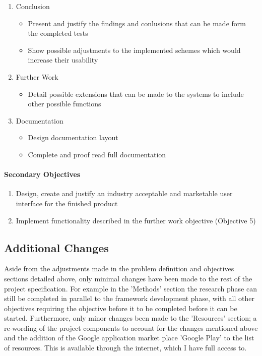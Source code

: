 \documentclass[a4paper,11pt]{article}
\begin{document}
\begin{enumerate}
\begin{itemize}
  \end{itemize}
  \item Conclusion
  \begin{itemize}
    \item Present and justify the findings and conlusions that can be made form the completed tests
    \item Show possible adjustments to the implemented schemes which would increase their usability
  \end{itemize}
  \item Further Work
  \begin{itemize}
    \item Detail possible extensions that can be made to the systems to include other possible functions
  \end{itemize}
  \item Documentation
  \begin{itemize}
    \item Design documentation layout
    \item Complete and proof read full documentation
  \end{itemize}
\end{enumerate}

\paragraph{Secondary Objectives}
\begin{enumerate}
  \item Design, create and justify an industry acceptable and marketable user interface for the finished product
  \item Implement functionality described in the further work objective (Objective 5)
\end{enumerate}

\subsection{Additional Changes}

Aside from the adjustments made in the problem definition and objectives sections detailed above, only minimal changes have been made to the rest of the project specification. For example in the 'Methods' section the research phase can still be completed in parallel to the framework development phase, with all other objectives requiring the objective before it to be completed before it can be started. Furthermore, only minor changes been made to the 'Resources' section; a re-wording of the project components to account for the changes mentioned above and the addition of the Google application market place 'Google Play' to the list of resources. This is available through the internet, which I have full access to.
\end{document}
